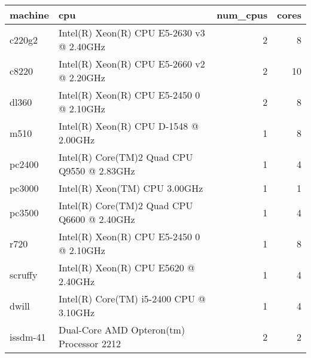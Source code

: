 \begin{tabular}{llrr}
\toprule
                                      machine &                                              cpu &  num\_cpus &  cores \\
\midrule
   c220g2 &        Intel(R) Xeon(R) CPU E5-2630 v3 @ 2.40GHz &         2 &      8 \\
 c8220 &        Intel(R) Xeon(R) CPU E5-2660 v2 @ 2.20GHz &         2 &     10 \\
 dl360 &         Intel(R) Xeon(R) CPU E5-2450 0 @ 2.10GHz &         2 &      8 \\
     m510 &            Intel(R) Xeon(R) CPU D-1548 @ 2.00GHz &         1 &      8 \\
       pc2400 &  Intel(R) Core(TM)2 Quad CPU    Q9550  @ 2.83GHz &         1 &      4 \\
             pc3000 &                    Intel(R) Xeon(TM) CPU 3.00GHz &         1 &      1 \\
       pc3500 &  Intel(R) Core(TM)2 Quad CPU    Q6600  @ 2.40GHz &         1 &      4 \\
       r720 &         Intel(R) Xeon(R) CPU E5-2450 0 @ 2.10GHz &         1 &      8 \\
                                      scruffy &  Intel(R) Xeon(R) CPU           E5620  @ 2.40GHz &         1 &      4 \\
                                        dwill &          Intel(R) Core(TM) i5-2400 CPU @ 3.10GHz &         1 &      4 \\
                                     issdm-41 &         Dual-Core AMD Opteron(tm) Processor 2212 &         2 &      2 \\
\bottomrule
\end{tabular}
